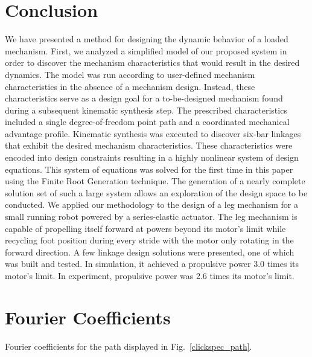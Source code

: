 \documentclass[journal]{IEEEtran}
\begin{document}
\section{Conclusion}
\label{sec:conclusion}

We have presented a method for designing the dynamic behavior of a loaded mechanism.
First, we analyzed a simplified model of our proposed system in order to discover the mechanism characteristics that would result in the desired dynamics.
The model was run according to user-defined mechanism characteristics in the absence of a mechanism design.
Instead, these characteristics serve as a design goal for a to-be-designed mechanism found during a subsequent kinematic synthesis step.
The prescribed characteristics included a single degree-of-freedom point path and a coordinated mechanical advantage profile.
Kinematic synthesis was executed to discover six-bar linkages that exhibit the desired mechanism characteristics.
These characteristics were encoded into design constraints resulting in a highly nonlinear system of design equations.
This system of equations was solved for the first time in this paper using the Finite Root Generation technique.
The generation of a nearly complete solution set of such a large system allows an exploration of the design space to be conducted.
We applied our methodology to the design of a leg mechanism for a small running robot powered by a series-elastic actuator.
The leg mechanism is capable of propelling itself forward at powers beyond its motor's limit while recycling foot position during every stride with the motor only rotating in the forward direction.
A few linkage design solutions were presented, one of which was built and tested.
In simulation, it achieved a propulsive power 3.0 times its motor's limit.  In experiment, propulsive power was 2.6 times its motor's limit.



\appendices
\section{Fourier Coefficients}
\label{app:fourier_coefficients}

\vspace{2mm}

Fourier coefficients for the path displayed in Fig.~\ref{clickspec_path}.

\vspace{2mm}
\end{document}
